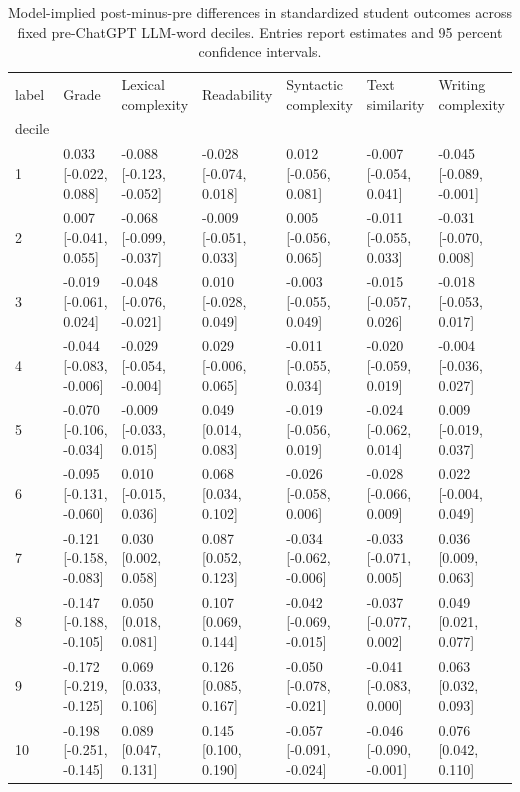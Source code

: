 \begin{table}
\caption{Model-implied post-minus-pre differences in standardized student outcomes across fixed pre-ChatGPT LLM-word deciles. Entries report estimates and 95 percent confidence intervals.}
\label{tab:llm_decile_margins_standardized}
\begin{tabular}{lllllll}
\toprule
label & Grade & Lexical complexity & Readability & Syntactic complexity & Text similarity & Writing complexity \\
decile &  &  &  &  &  &  \\
\midrule
1 & 0.033 [-0.022, 0.088] & -0.088 [-0.123, -0.052] & -0.028 [-0.074, 0.018] & 0.012 [-0.056, 0.081] & -0.007 [-0.054, 0.041] & -0.045 [-0.089, -0.001] \\
2 & 0.007 [-0.041, 0.055] & -0.068 [-0.099, -0.037] & -0.009 [-0.051, 0.033] & 0.005 [-0.056, 0.065] & -0.011 [-0.055, 0.033] & -0.031 [-0.070, 0.008] \\
3 & -0.019 [-0.061, 0.024] & -0.048 [-0.076, -0.021] & 0.010 [-0.028, 0.049] & -0.003 [-0.055, 0.049] & -0.015 [-0.057, 0.026] & -0.018 [-0.053, 0.017] \\
4 & -0.044 [-0.083, -0.006] & -0.029 [-0.054, -0.004] & 0.029 [-0.006, 0.065] & -0.011 [-0.055, 0.034] & -0.020 [-0.059, 0.019] & -0.004 [-0.036, 0.027] \\
5 & -0.070 [-0.106, -0.034] & -0.009 [-0.033, 0.015] & 0.049 [0.014, 0.083] & -0.019 [-0.056, 0.019] & -0.024 [-0.062, 0.014] & 0.009 [-0.019, 0.037] \\
6 & -0.095 [-0.131, -0.060] & 0.010 [-0.015, 0.036] & 0.068 [0.034, 0.102] & -0.026 [-0.058, 0.006] & -0.028 [-0.066, 0.009] & 0.022 [-0.004, 0.049] \\
7 & -0.121 [-0.158, -0.083] & 0.030 [0.002, 0.058] & 0.087 [0.052, 0.123] & -0.034 [-0.062, -0.006] & -0.033 [-0.071, 0.005] & 0.036 [0.009, 0.063] \\
8 & -0.147 [-0.188, -0.105] & 0.050 [0.018, 0.081] & 0.107 [0.069, 0.144] & -0.042 [-0.069, -0.015] & -0.037 [-0.077, 0.002] & 0.049 [0.021, 0.077] \\
9 & -0.172 [-0.219, -0.125] & 0.069 [0.033, 0.106] & 0.126 [0.085, 0.167] & -0.050 [-0.078, -0.021] & -0.041 [-0.083, 0.000] & 0.063 [0.032, 0.093] \\
10 & -0.198 [-0.251, -0.145] & 0.089 [0.047, 0.131] & 0.145 [0.100, 0.190] & -0.057 [-0.091, -0.024] & -0.046 [-0.090, -0.001] & 0.076 [0.042, 0.110] \\
\bottomrule
\end{tabular}
\end{table}
